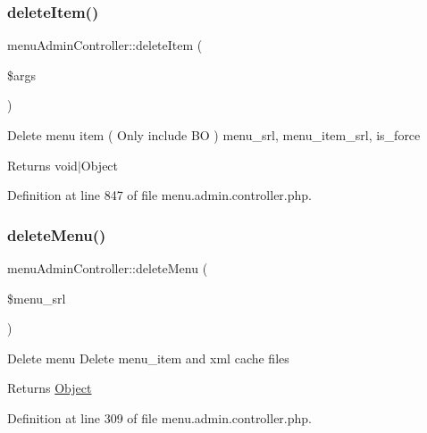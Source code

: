 \hypertarget{classmenuAdminController_a0a1051857eeec06de37b3d09729bd816}{}\label{classmenuAdminController_a0a1051857eeec06de37b3d09729bd816} 
\subsubsection{\texorpdfstring{delete\+Item()}{deleteItem()}}
{\footnotesize\ttfamily menu\+Admin\+Controller\+::delete\+Item (\begin{DoxyParamCaption}\item[{}]{\$args }\end{DoxyParamCaption})}

Delete menu item ( Only include BO )  menu\+\_\+srl, menu\+\_\+item\+\_\+srl, is\+\_\+force \begin{DoxyReturn}{Returns}
void$\vert$\+Object 
\end{DoxyReturn}


Definition at line 847 of file menu.\+admin.\+controller.\+php.

\hypertarget{classmenuAdminController_a586b343461b2f2f5e66fd92dd5ed04df}{}\label{classmenuAdminController_a586b343461b2f2f5e66fd92dd5ed04df} 
\subsubsection{\texorpdfstring{delete\+Menu()}{deleteMenu()}}
{\footnotesize\ttfamily menu\+Admin\+Controller\+::delete\+Menu (\begin{DoxyParamCaption}\item[{}]{\$menu\+\_\+srl }\end{DoxyParamCaption})}

Delete menu Delete menu\+\_\+item and xml cache files \begin{DoxyReturn}{Returns}
\hyperlink{classObject}{Object} 
\end{DoxyReturn}


Definition at line 309 of file menu.\+admin.\+controller.\+php.

\hypertarget{classmenuAdminController_a1aac19bba8c7abfc8a284b1d3c8b4424}{}\label{classmenuAdminController_a1aac19bba8c7abfc8a284b1d3c8b4424} 
